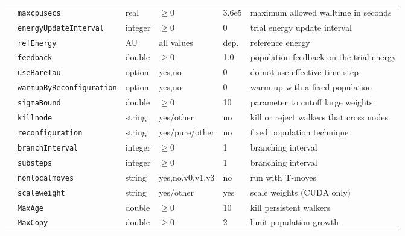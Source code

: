 \begin{table}[h]
\begin{center}
\begin{tabularx}{\textwidth}{l l l l l l }
   &   \texttt{maxcpusecs          } &  real  & $\ge 0$ & 3.6e5   & maximum allowed walltime in seconds \\
   &   \texttt{energyUpdateInterval} &  integer  & $\ge 0$ & 0   & trial energy update interval \\
   &   \texttt{refEnergy           } &  AU  & all values & dep.   & reference energy  \\
   &   \texttt{feedback            } &  double  & $\ge 0$ & 1.0   & population feedback on the trial energy \\
   &   \texttt{useBareTau          } &  option  & yes,no & 0   & do not use effective time step  \\
   &   \texttt{warmupByReconfiguration} &  option  & yes,no & 0   & warm up with a fixed population  \\
   &   \texttt{sigmaBound          } &  double  & $\ge 0$  & 10   & parameter to cutoff large weights  \\
   &   \texttt{killnode            } &  string  & yes/other & no   & kill or reject walkers that cross nodes  \\
   &   \texttt{reconfiguration     } &  string  & yes/pure/other & no   & fixed population technique  \\
   &   \texttt{branchInterval      } &  integer  & $\ge 0$ & 1   & branching interval \\
   &   \texttt{substeps            } &  integer  & $\ge 0$ & 1   & branching interval \\
   &   \texttt{nonlocalmoves       } &  string  & yes,no,v0,v1,v3 & no   & run with T-moves  \\
   &   \texttt{scaleweight         } &  string  & yes/other & yes   & scale weights (CUDA only)  \\
   &   \texttt{MaxAge              } &  double  & $\ge 0$ & 10   & kill persistent walkers  \\
    &   \texttt{MaxCopy             } &  double  & $\ge 0$ &2   & limit population growth \\

\end{tabularx}
\end{center}
\end{table}
